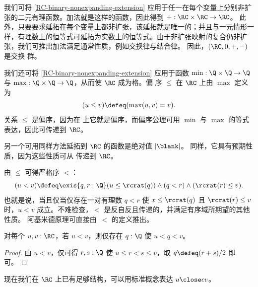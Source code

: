 我们可将 \cref{RC-binary-nonexpanding-extension} 应用于任一在每个变量上分别非扩张的二元有理函数。加法就是这样的函数，因此得到 ${+} : \RC \times \RC \to \RC$。
%
此外，只要要求延拓在每个变量上都非扩张，该延拓就是唯一的；并且与一元情形一样，有理数上的恒等式可延拓为实数上的恒等式。由于非扩张映射的复合仍非扩张，我们可推出加法满足通常性质，例如交换律与结合律。
%
因此，$(\RC, 0, {+}, {-})$ 是交换
群。

我们还可将 \cref{RC-binary-nonexpanding-extension} 应用于函数 $\min : \Q \times
\Q \to \Q$ 与 $\max : \Q \times \Q \to \Q$，从而使 $\RC$ 成为格。偏
序 $\leq$ 在 $\RC$ 上由 $\max$ 定义为
%
%
%
\begin{equation*}
  (u \leq v) \defeq (\max(u, v) = v).
\end{equation*}
%
关系 $\leq$ 是偏序，因为在 \Q 上它就是偏序，而偏序公理可用 $\min$ 与 $\max$ 的等式表达，因此可传递到
$\RC$。

%
另一个可用同样方法延拓到 $\RC$ 的函数是绝对值 $|{\blank}|$。
同样，它具有预期性质，因为这些性质可从 \Q 传递到 $\RC$。

由 $\leq$ 可得严格序 $<$：
%
%
%
\begin{equation*}
  (u < v) \defeq \exis{q, r : \Q} (u \leq \rcrat(q)) \land (q < r) \land (\rcrat(r) \leq v).
\end{equation*}
%
也就是说，当且仅当仅存在一对有理数 $q < r$ 使 $x \leq
\rcrat(q)$ 且 $\rcrat(r) \leq v$ 时，$u < v$ 成立。不难检查，$<$ 是反自反且传递的，并满足有序域所期望的其他性质。
阿基米德原理可直接由~$<$ 的定义推出。

%
\begin{thm}[$\RC$ 的阿基米德原理] \label{RC-archimedean}
  对每个 $u, v : \RC$，若 $u < v$，则仅存在 $q : \Q$ 使 $u < q < v$。
\end{thm}

\begin{proof}
  由 $u < v$，仅可得 $r, s : \Q$ 使 $u \leq r < s \leq v$，取 $q
  \defeq (r + s) / 2$ 即可。
\end{proof}

现在我们在 $\RC$ 上已有足够结构，可以用标准概念表达 $u \close\epsilon v$。


